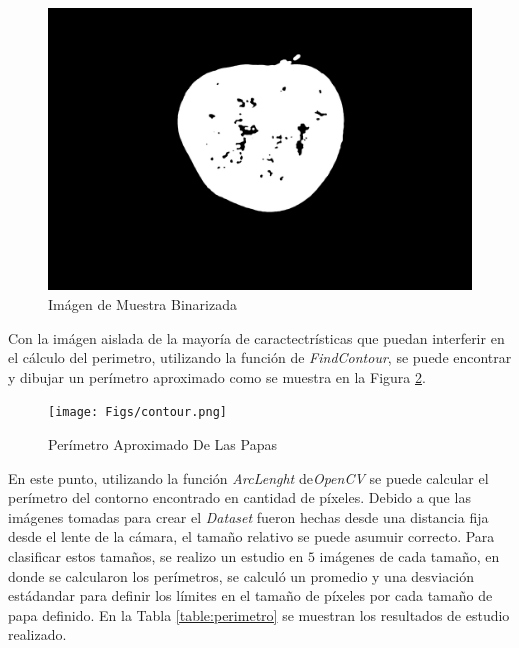 	\begin{figure}[ht]
		\centering
		\includegraphics[scale=0.05]{Figs/dilmed.png}
		\caption{Imágen de Muestra Binarizada}
		\label{fig:dilmed}
	\end{figure}

	Con la imágen aislada de la mayoría de caractectrísticas que puedan interferir en el cálculo del perimetro, utilizando la función de \textit{FindContour}, se puede encontrar y dibujar un perímetro aproximado como se muestra en la Figura \ref{fig:contour}.
	
	\begin{figure}[ht]
		\centering
		\texttt{[image: Figs/contour.png]}
		\caption{Perímetro Aproximado De Las Papas}
		\label{fig:contour}
	\end{figure}
	
	En este punto, utilizando la función \textit{ArcLenght} de\textit{OpenCV} se puede calcular el perímetro del contorno encontrado en cantidad de píxeles. Debido a que las imágenes tomadas para crear el \textit{Dataset} fueron hechas desde una distancia fija desde el lente de la cámara, el tamaño relativo se puede asumuir correcto. Para clasificar estos tamaños, se realizo un estudio en $5$ imágenes de cada tamaño, en donde se calcularon los perímetros, se calculó un promedio y una desviación estádandar para definir los límites en el tamaño de píxeles por cada tamaño de papa definido. En la Tabla \ref{table:perimetro} se muestran los resultados de estudio realizado.
	
